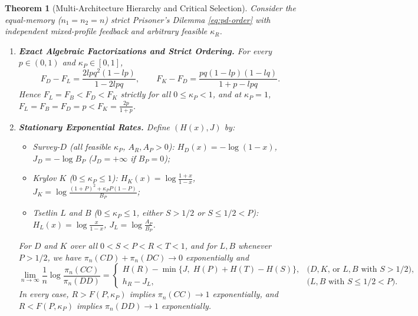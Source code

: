 \documentclass[11pt,reqno]{amsart}
\newtheorem{theorem}{Theorem}[section]
\theoremstyle{definition}
\theoremstyle{remark}
\begin{document}
\begin{theorem}[Multi-Architecture Hierarchy and Critical Selection]\label{thm:hierarchy}
Consider the equal-memory ($n_1 = n_2 = n$) strict Prisoner's Dilemma \eqref{eq:pd-order} with independent mixed-profile feedback and arbitrary feasible $\kappa_R$.
\begin{enumerate}
  \item \textbf{Exact Algebraic Factorizations and Strict Ordering.} For every $p \in (0,1)$ and $\kappa_P \in [0,1]$,
  \begin{equation}\label{eq:factorizations}
    F_D - F_L = \frac{2 l p q^2 (1 - l p)}{1 - 2 l p q}, \qquad
    F_K - F_D = \frac{p q (1 - l p)(1 - l q)}{1 + p - l p q}.
  \end{equation}
  Hence $F_L = F_B < F_D < F_K$ strictly for all $0 \le \kappa_P < 1$, and at $\kappa_P = 1$, $F_L = F_B = F_D = p < F_K = \frac{2p}{1+p}$.

  \item \textbf{Stationary Exponential Rates.} Define $(H(x), J)$ by:
  \begin{itemize}
    \item Survey-$D$ (all feasible $\kappa_P$, $A_R, A_P > 0$): $H_D(x) = -\log(1-x)$, $J_D = -\log B_P$ ($J_D = +\infty$ if $B_P = 0$);
    \item Krylov $K$ ($0 \le \kappa_P \le 1$): $H_K(x) = \log\frac{1+x}{1-x}$, $J_K = \log\frac{(1+P)^2 + \kappa_P P(1-P)}{B_P}$;
    \item Tsetlin $L$ and $B$ ($0 \le \kappa_P \le 1$, either $S > 1/2$ or $S \le 1/2 < P$): $H_L(x) = \log\frac{x}{1-x}$, $J_L = \log\frac{A_P}{B_P}$.
  \end{itemize}
  For $D$ and $K$ over all $0 < S < P < R < T < 1$, and for $L,B$ whenever $P > 1/2$, we have $\pi_n(CD) + \pi_n(DC) \to 0$ exponentially and
  \begin{equation}\label{eq:log-odds}
    \lim_{n\to\infty}\frac{1}{n}\log\frac{\pi_n(CC)}{\pi_n(DD)} =
    \begin{cases}
      H(R) - \min\{J,\; H(P) + H(T) - H(S)\}, & \text{($D, K$, or $L, B$ with $S > 1/2$),}\\
      h_R - J_L, & \text{($L, B$ with $S \le 1/2 < P$).}
    \end{cases}
  \end{equation}
  In every case, $R > F(P,\kappa_P)$ implies $\pi_n(CC) \to 1$ exponentially, and $R < F(P,\kappa_P)$ implies $\pi_n(DD) \to 1$ exponentially.


\end{enumerate}
\end{theorem}
\end{document}

